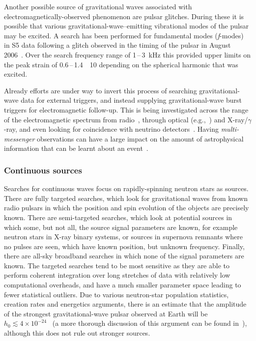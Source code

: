Another possible source of gravitational waves associated with
electromagnetically-observed phenomenon are pulsar glitches. During these it is
possible that various gravitational-wave--emitting vibrational modes of the
pulsar may be excited. A search has been performed for fundamental modes
(\textit{f}-modes) in S5 data following a glitch observed in the
timing of the  pulsar in August
2006~\cite{Abadie:2010a}. Over the search frequency range of
1\,--\,3~kHz this provided upper limits on the peak strain of
0.6\,--\,1.4~\texttimes~10 depending on the spherical
harmonic that was excited. 


Already efforts are under way to invert this process of searching gravitational-wave data for external triggers, and instead supplying gravitational-wave burst
triggers for electromagnetic follow-up. This is being investigated across the
range of the electromagnetic spectrum from radio~\cite{Predoi:2010}, through
optical (e.g.,~\cite{Kanner:2008, Coward:2010}) and X-ray/$\gamma$-ray, and even
looking for coincidence with neutrino detectors~\cite{Aso:2008, Pradier:2010,
Chassande:2010}. Having \textit{multi-messenger} observations can have a
large impact on the amount of astrophysical information that can be learnt about
an event~\cite{Phinney:2009}.


\subsubsection{Continuous sources}


Searches for continuous waves focus on rapidly-spinning neutron stars as
sources. There are fully targeted searches, which look for gravitational waves
from known radio pulsars in which the position and spin evolution of the objects
are precisely known. There are semi-targeted searches, which look at potential
sources in which some, but not all, the source signal parameters are known, for
example neutron stars in X-ray binary systems, or sources in supernova remnants
where no pulses are seen, which have known position, but unknown frequency.
Finally, there are all-sky broadband searches in which none of the signal
parameters are known. The targeted searches tend to be most sensitive as they
are able to perform coherent integration over long stretches of data with
relatively low computational overheads, and have a much smaller parameter space
leading to fewer statistical outliers. Due to various neutron-star population
statistics, creation rates and energetics arguments, there is an estimate that
the amplitude of the strongest gravitational-wave pulsar observed at Earth will
be $h_0 \lesssim 4\times10^{-24}$~\cite{Abbott:2007a} (a more thorough
discussion of this argument can be found in~\cite{Knispel:2008}), although this
does not rule out stronger sources.



